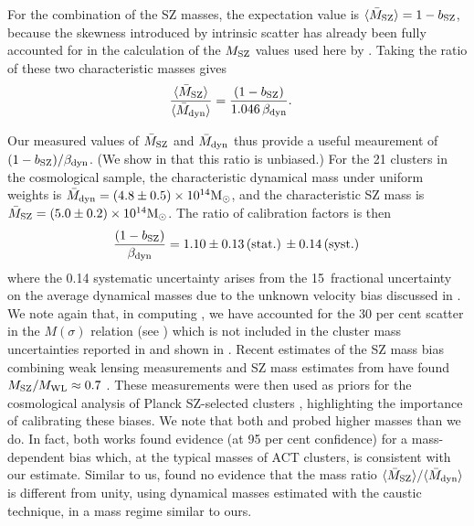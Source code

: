 For the combination of the SZ masses, the expectation value is $\langle \bar{M}_{\rm SZ} 
\rangle=1-b_{\rm SZ}$, because the skewness introduced by intrinsic scatter has already been fully 
accounted for in the calculation of the $M_{\rm SZ}$ values used here by \cite{hasselfield13}.  
Taking the ratio of these two characteristic masses gives
\begin{align}
  \frac{\langle \bar{M}_{\rm SZ} \rangle}{\langle \bar{M}_{\rm dyn} \rangle} &
   = \frac{(1-b_{\rm SZ})}{1.046\,\beta_{\rm dyn}}.
\end{align}

Our measured values of $\bar{M}_{\rm SZ}$ and $\bar{M}_{\rm dyn}$ thus provide a useful meaurement 
of $(1-b_{\rm SZ}) / \beta_{\rm dyn}$. (We show in  that this ratio is unbiased.) 
For the 21 clusters in the cosmological sample, the characteristic dynamical mass under uniform 
weights is $\bar{M}_{\rm dyn} = (4.8 \pm 0.5) \times 10^{14} {\rm M}_\odot$, and the characteristic SZ 
mass is $\bar{M}_{\rm SZ} = (5.0 \pm 0.2) \times 10^{14} {\rm M}_\odot$. The ratio of calibration factors 
is then
\begin{align}\label{eq:massbias}
  \frac{(1-b_{\rm SZ})}{\beta_{\rm dyn}} = 1.10\pm0.13 \, ({\rm stat.}) \, \pm 0.14 \, ({\rm syst.}) \,
\end{align}
where the 0.14 systematic uncertainty arises from the 15\percent\ fractional uncertainty on the average dynamical masses due to the unknown velocity bias discussed in . We note again that, in computing , we have accounted for the 30 per cent scatter in the $M(\sigma)$ relation (see ) which is not included in the cluster mass uncertainties reported in  and shown in . Recent estimates of the SZ mass bias combining weak lensing measurements and SZ mass estimates from \cite{planck15xxvii} have found $M_{\rm SZ}/M_{\rm WL}\approx0.7$ \citep{vonderlinden14_planck,hoekstra15}. These measurements were then used as priors for the cosmological analysis of Planck SZ-selected clusters \citep[under the assumption that $\langle{M}_{\rm WL}\rangle=\langle{M}_{\rm true}\rangle$,][]{planck15xxiv}, highlighting the importance of calibrating these biases. We note that both \cite{vonderlinden14_planck} and \cite{hoekstra15} probed higher masses than we do. In fact, both works found evidence (at 95 per cent confidence) for a mass-dependent bias which, at the typical masses of ACT clusters, is consistent with our estimate. Similar to us, \cite{rines16} found no evidence that the mass ratio $\langle\bar{M}_{\rm SZ}\rangle/\langle\bar{M}_{\rm dyn}\rangle$ is different from unity, using  dynamical masses estimated with the caustic technique, in a mass regime similar to ours.

